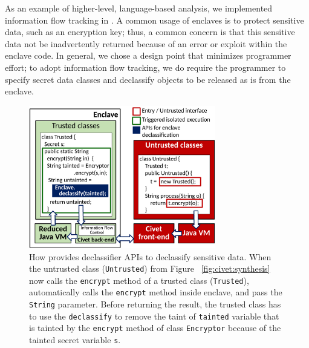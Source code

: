 As an example of higher-level, language-based analysis, we implemented information flow tracking
in \sysname{}.
A common usage of enclaves is to protect sensitive data, such as an encryption key;
thus, a common concern is that this sensitive data not be inadvertently returned because of an error or exploit within the enclave code.
In general, we chose a design point that minimizes programmer effort; to adopt information flow tracking, we
do require the programmer to specify secret data classes and declassify objects to be released as is from the enclave.

\begin{figure}[t!]
\centering
\includegraphics[width=3.2in]{civet/figures/declassify.pdf}
\footnotesize
\caption[The \sysname{} declassifier APIs.]
{How \sysname{} provides declassifier APIs to declassify sensitive data.
When the untrusted class ({\tt Untrusted}) from Figure ~\ref{fig:civet:synthesis} now calls the {\tt encrypt} method of a trusted class ({\tt Trusted}),
\sysname{} automatically calls the {\tt encrypt} method inside enclave, and pass the {\tt String} parameter.
Before returning the result, the trusted class has to use the {\tt declassify} to remove the taint of {\tt tainted} variable that is tainted by the {\tt encrypt} method of class {\tt Encryptor} because of the tainted secret variable {\tt s}.
}
\label{fig:civet:declassify}
\end{figure}


